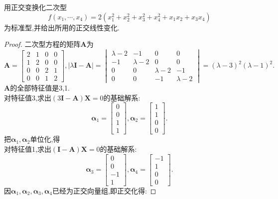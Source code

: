 \documentclass[lang=cn,11pt,normal]{elegantbook}
\begin{document}
	\begin{exercise}
		用正交变换化二次型
		$$
		f(x_1,\cdots,x_4)=2(x_1^2+x_2^2+x_3^2+x_4^2+x_1x_2+x_3x_4)
		$$
		为标准型,并给出所用的正交线性变化.
	\end{exercise}
	\begin{proof}
		二次型方程的矩阵$\boldsymbol{A}$为
		$$
		\boldsymbol{A}=
		\begin{bmatrix}
		2&1&0&0\\
		1&2&0&0\\
		0&0&2&1\\
		0&0&1&2
		\end{bmatrix},
		|\lambda\boldsymbol{I}-\boldsymbol{A}|=
		\begin{vmatrix}
		\lambda-2&-1&0&0\\
		-1&\lambda-2&0&0\\
		0&0&\lambda-2&-1\\
		0&0&-1&\lambda-2
		\end{vmatrix}
		=(\lambda-3)^2(\lambda-1)^2.
		$$
		$\boldsymbol{A}$的全部特征值是3,1.\\
		对特征值3,求出$(3\boldsymbol{I}-\boldsymbol{A})\boldsymbol{X}=0$的基础解系:
		$$
		\boldsymbol{\alpha}_1=
		\begin{bmatrix}
		0\\0\\1\\1
		\end{bmatrix},
		\boldsymbol{\alpha}_2=
		\begin{bmatrix}
		1\\1\\0\\0
		\end{bmatrix}.
		$$
		把$\boldsymbol{\alpha}_1,\boldsymbol{\alpha}_2$单位化,得\\
		对特征值1,求出$(\boldsymbol{I}-\boldsymbol{A})\boldsymbol{X}=0$的基础解系:
		$$
		\boldsymbol{\alpha}_3=
		\begin{bmatrix}
		0\\0\\-1\\1
		\end{bmatrix},
		\boldsymbol{\alpha}_4=
		\begin{bmatrix}
		-1\\1\\0\\0
		\end{bmatrix}.
		$$
		因$\boldsymbol{\alpha}_1,\boldsymbol{\alpha}_2,\boldsymbol{\alpha}_3,\boldsymbol{\alpha}_4$已经为正交向量组,即正交化得:

\end{proof}
\end{document}
